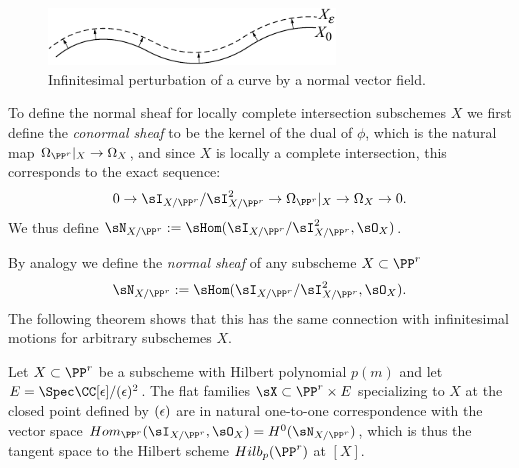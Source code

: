\begin{figure}
\centerline {\includegraphics[width=3in]{"main/Fig06-0"}}
 \caption{Infinitesimal perturbation of a curve by a normal vector field.}
\end{figure}

To define the normal sheaf for locally complete intersection subschemes $X$ we first define the \emph{conormal sheaf}
to be the kernel of the dual  of $\phi$, which is the natural map $\Omega_{\PP^r}|_X \to \Omega_X$,
and since $X$ is locally a complete intersection, this corresponds to the exact sequence:
$$
0\to \sI_{X/\PP^r}/\sI_{X/\PP^r}^2 \to \Omega_{\PP^r}|_X \to \Omega_X \to 0.
$$
We thus define $\sN_{X/\PP^r} := \sHom(\sI_{X/\PP^r}/\sI_{X/\PP^r}^2, \sO_X)$.

By analogy we define the \emph{normal sheaf} of any subscheme $X\subset \PP^r$
$$
\sN_{X/\PP^r} := \sHom(\sI_{X/\PP^r}/\sI_{X/\PP^r}^2, \sO_X).
$$
The following theorem shows that this
has the same connection with infinitesimal motions for arbitrary subschemes $X$.


\begin{theorem}\label{tangent space of Hilb}
Let $X\subset \PP^r$ be a subscheme with Hilbert polynomial $p(m)$ and let
$E = \Spec\CC[\eps]/(\eps)^{2}$. The flat families 
$\sX \subset \PP^r\times E$ specializing to $X$ at the closed point defined by $(\eps)$
are in natural one-to-one correspondence with the vector space $Hom_{\PP^r}(\sI_{X/\PP^r}, \sO_X) = H^0(\sN_{X/\PP^r})$, which is thus the tangent space to the Hilbert scheme $Hilb_{p}(\PP^r)$ at $[X]$.
\end{theorem}


